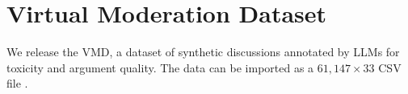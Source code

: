 %

\section{Virtual Moderation Dataset}

We release the \ac{VMD}, a dataset of synthetic discussions annotated by \acp{LLM} for toxicity and argument quality. The data can be imported as a $61,147 \times 33$ CSV file \datasetlink.


